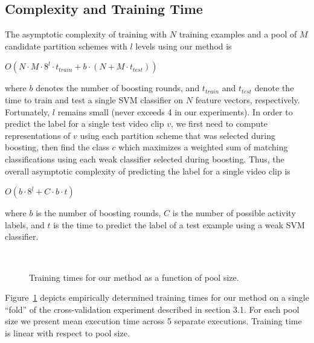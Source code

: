 \documentclass[12pt]{article} %
\begin{document}
  
	




  \subsection{Complexity and Training Time}
  The asymptotic complexity of training with $N$ training examples 
  and a pool of $M$ candidate partition schemes with $l$ levels using our
  method is 
  \begin{center}
  $O(N\cdot M \cdot 8^l \cdot t_{train} + b \cdot (N + M \cdot t_{test}))$
  \end{center}
  where $b$ denotes the number of boosting rounds, and $t_{train}$ and
  $t_{test}$ denote the time to train and test a single SVM classifier on
  $N$ feature vectors, respectively. Fortunately, $l$ remains small (never
  exceeds 4 in our experiments). In order to predict the label for a single
  test video clip $v$, we first need to compute representations of $v$ using
  each partition scheme that was selected during boosting, then find the
  class $c$ which maximizes a weighted sum of matching classifications using
  each weak classifier selected during boosting.
  Thus, the overall
  asymptotic complexity of predicting the
  label for a single video clip is 
  \begin{center}
  $O(b \cdot 8^l + C \cdot b \cdot t)$
  \end{center}
  where $b$ is the number of boosting rounds, $C$ is the number of possible
  activity labels, and $t$ is the time to predict the label of a test
  example using a weak SVM classifier.
  
\begin{figure}
  \begin{center}
\\
		   \caption{Training times for our method as a function of pool size.}
\label{fig:runtime}
  \end{center}
\end{figure}
Figure~\ref{fig:runtime} depicts empirically determined training times for our method on a
  single ``fold'' of the cross-validation experiment described in section
  3.1. For each pool size we present mean execution time across 5 separate
  executions. Training time is linear with respect to pool size.
  
\end{document}
